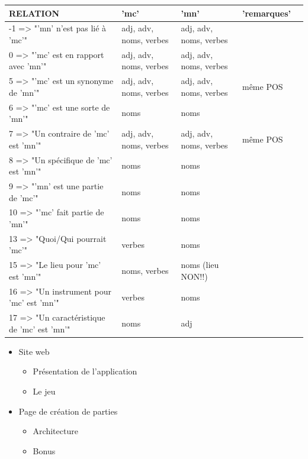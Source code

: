 \documentclass{beamer}
\begin{document}
\begin{frame}
\begin{center}
        \begin{tabular}{ | l | l | l | l | p{5cm} |}
        \hline
RELATION &	'mc' & 'mn'	& 'remarques' \\ \hline
-1 => "'mn' n'est pas lié à 'mc'" &	adj, adv, noms, verbes & adj, adv, noms, verbes	& \\ \hline
0 =>  "'mc' est en rapport avec 'mn'" & adj, adv, noms, verbes & adj, adv, noms, verbes & \\ \hline
5 => "'mc' est un synonyme de 'mn'" & adj, adv, noms, verbes & adj, adv, noms, verbes & même POS \\ \hline
6 => "'mc' est une sorte de 'mn'" & noms & noms & \\ \hline
7 => "Un contraire de 'mc' est 'mn'" & adj, adv, noms, verbes &	adj, adv, noms, verbes & même POS \\ \hline
8 => "Un spécifique de 'mc' est 'mn'" & noms & noms & \\ \hline
9 => "'mn' est une partie de 'mc'" & noms & noms & \\ \hline
10 => "'mc' fait partie de 'mn'" & noms & noms & \\ \hline
13 => "Quoi/Qui pourrait 'mc'" & verbes & noms & \\ \hline
15 => "Le lieu pour 'mc' est 'mn'" & noms, verbes & noms (lieu NON!!) & \\ \hline
16 => "Un instrument pour 'mc' est 'mn'" & verbes & noms & \\ \hline
17 => "Un caractéristique de 'mc' est 'mn'" & noms & adj & \\ \hline
        \end{tabular}
\end{center}
\end{frame}

\begin{frame}
  \begin{itemize}
  \item Site web
    \begin{itemize}
    \item Présentation de l'application
    \item Le jeu
    \end{itemize}
  \item Page de création de parties
    \begin{itemize}
    \item Architecture
    \item Bonus
    \end{itemize}
  \end{itemize}
\end{frame}
\end{document}
